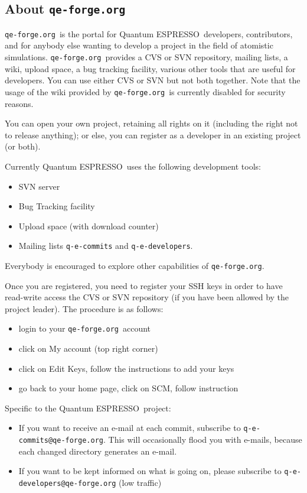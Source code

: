 \documentclass[12pt,a4paper]{article}
\def\qe{{\sc Quantum ESPRESSO}}
\def\qeforge{\texttt{qe-forge.org}}
\begin{document}
\subsection{About \qeforge}
\qeforge\ is the portal for \qe\ developers, contributors,
and for anybody else wanting to develop a project in the
field of atomistic simulations.  \qeforge\ provides a CVS 
or SVN repository, mailing lists, a wiki, upload space, a
bug tracking facility, various other tools that are useful 
for developers. You can use either CVS or SVN but not both
together. Note that the usage of the wiki provided by \qeforge\ 
is currently disabled for security reasons.

You can open your own project, retaining all rights on it (including 
the right not to release anything); or else, you can register as a 
developer in an existing project (or both).

Currently \qe\ uses the following development tools:
\begin{itemize}
\item SVN server
\item Bug Tracking facility
\item Upload space (with download counter)
\item Mailing lists \texttt{q-e-commits} and \texttt{q-e-developers}.
\end{itemize}
Everybody is encouraged to explore other capabilities of \qeforge.

Once you are registered, you need to register your SSH keys in order
to have read-write access the CVS or SVN repository (if you have been
allowed by the project leader). The procedure is as follows:
\begin{itemize}
\item login to your \qeforge\ account
\item click on My account (top right corner)
\item click on Edit Keys, follow the instructions to add your keys
\item go back to your home page, click on SCM, follow instruction
\end{itemize}

Specific to the \qe\ project:
\begin{itemize}
\item If you want to receive an e-mail at each commit, subscribe to
\texttt{q-e-commits@qe-forge.org}. This will occasionally 
flood you with e-mails, because each changed directory generates 
an e-mail. 
\item If you want to be kept informed on what is going on, please
subscribe to \texttt{q-e-developers@qe-forge.org} (low traffic)
\end{itemize}
\end{document}
